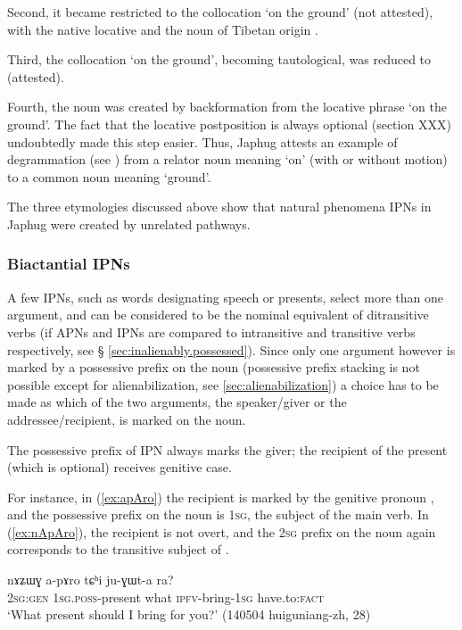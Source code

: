   Second, it  became restricted to the collocation  `on the ground' (not attested), with the native locative  and the  noun of Tibetan origin .
  
    Third, the collocation  `on the ground', becoming tautological, was reduced to  (attested).
 
 Fourth, the noun  was created by backformation from the locative phrase  `on the ground'. The fact that the locative postposition  is always optional (section XXX) undoubtedly made this step easier.  Thus, Japhug attests an example of degrammation (see \citealt[135]{norde09degrammaticalization}) from a relator noun meaning `on' (with or without motion) to a common noun meaning `ground'. 

The three etymologies discussed above show that natural phenomena IPNs in Japhug were created by unrelated pathways.


\subsubsection{Biactantial IPNs}
A few IPNs, such as words designating speech or presents, select more than one argument, and can be considered to be the nominal equivalent of ditransitive verbs (if APNs and IPNs are compared to intransitive and transitive verbs respectively, see § \ref{sec:inalienably.possessed}). Since only one argument however is marked by a possessive prefix on the noun (possessive prefix stacking is not possible except for alienabilization, see \ref{sec:alienabilization}) a choice has to be made as which of the two arguments, the speaker/giver or the addressee/recipient, is marked on the noun.

The possessive prefix of IPN  always marks the giver; the recipient of the present (which is optional) receives genitive case. 

For instance, in (\ref{ex:apAro}) the recipient is marked by the genitive pronoun , and the possessive prefix on the noun is \textsc{1sg}, the subject of the main verb. In (\ref{ex:nApAro}), the recipient is not overt, and the \textsc{2sg} prefix on the noun again corresponds to the transitive subject of .

\begin{exe}
\ex \label{ex:apAro}
\gll nɤʑɯɣ a-pɤro tɕʰi ju-ɣɯt-a ra? \\
\textsc{2sg:gen} \textsc{1sg}.\textsc{poss}-present what \textsc{ipfv}-bring-\textsc{1sg} have.to:\textsc{fact} \\
\glt `What present should I bring for you?' (140504 huiguniang-zh, 28)
\end{exe}

